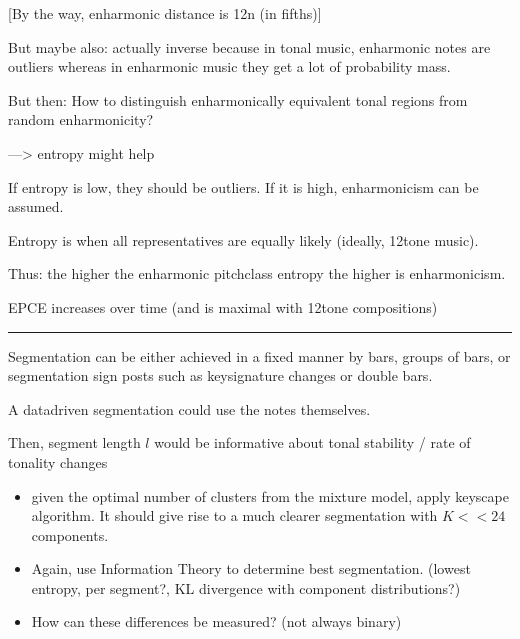 \documentclass[letterpaper,10pt,english]{sphinxmanual}
\begin{document}
\sphinxAtStartPar
{[}By the way, enharmonic distance is 12n (in fifths){]}

\sphinxAtStartPar
But maybe also: actually inverse because in tonal music, enharmonic
notes are outliers whereas in enharmonic music they get a lot of
probability mass.

\sphinxAtStartPar
But then: How to distinguish enharmonically equivalent tonal regions
from random enharmonicity?

\sphinxAtStartPar
—\textgreater{} entropy might help

\sphinxAtStartPar
If entropy is low, they should be outliers. If it is high, enharmonicism
can be assumed.

\sphinxAtStartPar
Entropy is  when all representatives are equally likely
(ideally, 12\sphinxhyphen{}tone music).

\sphinxAtStartPar
Thus: the higher the enharmonic pitch\sphinxhyphen{}class entropy the higher is
enharmonicism.

\sphinxAtStartPar
{} EPCE increases over time (and is maximal with 12\sphinxhyphen{}tone
compositions)


\bigskip\hrule\bigskip


\sphinxAtStartPar
Segmentation can be either achieved in a fixed manner by bars, groups of
bars, or segmentation sign posts such as key\sphinxhyphen{}signature changes or double
bars.

\sphinxAtStartPar
A data\sphinxhyphen{}driven segmentation could use the notes themselves.

\sphinxAtStartPar
Then, segment length \(l\) would be informative about tonal
stability / rate of tonality changes
\begin{itemize}
\item {} 
\sphinxAtStartPar
given the optimal number of clusters from the mixture model, apply
key\sphinxhyphen{}scape algorithm. It should give rise to a much clearer
segmentation with \(K<<24\) components.

\item {} 
\sphinxAtStartPar
Again, use Information Theory to determine best segmentation. (lowest
entropy, per segment?, KL divergence with component distributions?)

\item {} 
\sphinxAtStartPar
How can these differences be measured? (not always binary)

\end{itemize}
\end{document}
